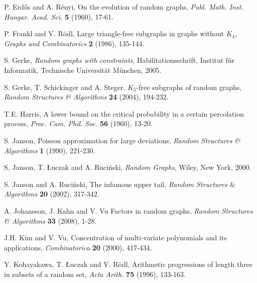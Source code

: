 \documentclass[letterpaper,11pt]{article}
\newcommand{\0}[0]{\emptyset}
\begin{document}
\begin{thebibliography}{99}


P. Erd\H{o}s and A. R\'enyi, On the evolution of random graphs,
{\em Publ. Math. Inst. Hungar. Acad. Sci.} {\bf 5} (1960), 17-61.


P. Frankl and V. R\"odl,
Large triangle-free subgraphs in graphs without $K_4$,
{\em Graphs and Combinatorics} {\bf 2} (1986), 135-144.


S. Gerke, {\em Random graphs with constraints},
Habilitationsschrift, Institut f\"ur Informatik,
Technische Universit\"at M\"unchen, 2005.

S. Gerke, T. Schickinger and A. Steger,
$K_5$-free subgraphs of random graphs,
{\em Random Structures \& Algorithms} {\bf 24} (2004), 194-232.


 T.E. Harris,
A lower bound on the critical probability in a certain percolation process,
\emph{Proc. Cam. Phil. Soc.} \textbf{56} (1960), 13-20.



S. Janson, Poisson approximation for large deviations,
{\em Random Structures \& Algorithms} {\bf 1} (1990), 221-230.


S. Janson, T. \L uczak and A. Ruci\'nski, \emph{Random Graphs}, Wiley, New York, 2000.


S. Janson and A. Ruci\'nski, The infamous upper tail,
\emph{Random Structures $\&$ Algorithms}
\textbf{20} (2002), 317-342.


  A. Johansson, J. Kahn and V. Vu
Factors in random graphs,
{\em Random Structures \& Algorithms} {\bf 33} (2008), 1-28.





 J.H. Kim and V. Vu,
Concentration of multi-variate polynomials and its applications,
{\em Combinatorica} {\bf 20} (2000), 417-434.





Y. Kohayakawa, T. \L uczak and V. R\"odl,
Arithmetic progressions of length three in subsets of a random set,
{\em Acta Arith.} {\bf 75} (1996), 133-163.


\end{thebibliography}
\end{document}
